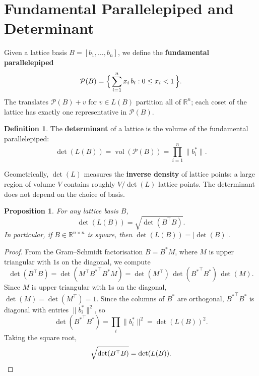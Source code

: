 \documentclass[11pt]{article}
\theoremstyle{plain}
\newtheorem{proposition}[theorem]{Proposition}
\theoremstyle{definition}
\newtheorem{definition}[theorem]{Definition}
\newtheorem{remark}[theorem]{Remark}
\newcommand{\Z}{\mathbb{Z}}
\newcommand{\R}{\mathbb{R}}
\newcommand{\vol}{\operatorname{vol}}
\begin{document}

\section{Fundamental Parallelepiped and Determinant}

Given a lattice basis $B = [b_1, \ldots, b_n]$, we define the \textbf{fundamental parallelepiped}
\[
  \mathcal{P}(B) = \Bigl\{\,\sum_{i=1}^{n} x_i\,b_i : 0 \le x_i < 1\,\Bigr\}.
\]
The translates $\mathcal{P}(B) + v$ for $v \in L(B)$ partition all of $\R^n$; each coset of the lattice has exactly one representative in $\mathcal{P}(B)$.

\begin{definition}
The \textbf{determinant} of a lattice is the volume of the fundamental parallelepiped:
\[
  \det(L(B)) = \vol(\mathcal{P}(B)) = \prod_{i=1}^{n} \|b_i^*\|.
\]
\end{definition}

Geometrically, $\det(L)$ measures the \textbf{inverse density} of lattice points: a large region of volume $V$ contains roughly $V/\det(L)$ lattice points. The determinant does not depend on the choice of basis.

\begin{proposition}
For any lattice basis $B$,
\[
  \det(L(B)) = \sqrt{\det(B^\top B)}.
\]
In particular, if $B \in \R^{n \times n}$ is square, then $\det(L(B)) = |\det(B)|$.
\end{proposition}

\begin{proof}
From the Gram--Schmidt factorisation $B = B^* M$, where $M$ is upper triangular with $1$s on the diagonal, we compute
\[
  \det(B^\top B) = \det(M^\top {B^*}^\top B^* M) = \det(M^\top)\,\det({B^*}^\top B^*)\,\det(M).
\]
Since $M$ is upper triangular with $1$s on the diagonal, $\det(M) = \det(M^\top) = 1$. Since the columns of $B^*$ are orthogonal, ${B^*}^\top B^*$ is diagonal with entries $\|b_i^*\|^2$, so
\[
  \det({B^*}^\top B^*) = \prod_{i} \|b_i^*\|^2 = \det(L(B))^2.
\]
Taking the square root,
\[
  \sqrt{\det(B^\top B)} = \det(L(B)). \qedhere
\]
\end{proof}
\end{document}
